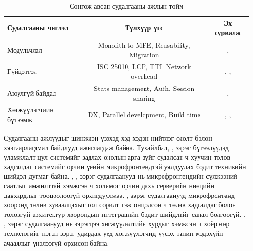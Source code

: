 \begin{table}[H]
\centering
\caption{Сонгож авсан судалгааны ажлын тойм}
\label{tab:related_work_summary}
\renewcommand{\arraystretch}{0.7}
\begin{tabular}{lcc}
\toprule
\textbf{Судалгааны чиглэл} & \textbf{Түлхүүр үгс} & \textbf{Эх сурвалж} \\
\midrule
Модульчлал & Monolith to MFE, Reusability, Migration & \cite{mannisto2023}, \cite{pavlenko2020} \\
Гүйцэтгэл & ISO 25010, LCP, TTI, Network overhead & \cite{ameer2024}, \cite{taibi2022}, \cite{stefanovska2022} \\
Аюулгүй байдал & State management, Auth, Session sharing & \cite{silva2024}, \cite{mohammed2022} \\
Хөгжүүлэгчийн бүтээмж & DX, Parallel development, Build time & \cite{bjelotomic2024}, \cite{tilak2020}, \cite{montelius2021} \\
\bottomrule
\end{tabular}
\end{table}

Судалгааны ажлуудыг шинжлэн үзэхэд хэд хэдэн нийтлэг ололт болон хязгаарлагдмал байдлууд ажиглагдаж байна. Тухайлбал, \cite{mannisto2023}, \cite{pavlenko2020} зэрэг бүтээлүүдэд уламжлалт цул системийг задлах онолын арга зүйг судалсан ч хуучин төлөв хадгалдаг системийг орчин үеийн микрофронтендтэй уялдуулах бодит техникийн шийдэл дутмаг байна. \cite{ameer2024}, \cite{taibi2022}, \cite{stefanovska2022} зэрэг судалгаанууд нь микрофронтендийн сүлжээний саатлыг амжилттай хэмжсэн ч холимог орчин дахь серверийн нөөцийн давхардлыг тооцоолоогүй орхигдуулжээ. \cite{silva2024}, \cite{mohammed2022} зэрэг судалгаанууд микрофронтенд хооронд төлөв хуваалцахыг гол сорилт гэж онцолсон ч төлөв хадгалдаг болон төлөвгүй архитектур хоорондын интеграцийн бодит шийдлийг санал болгоогүй. \cite{bjelotomic2024}, \cite{tilak2020}, \cite{montelius2021} зэрэг судалгаанууд нь зэрэгцээ хөгжүүлэлтийн хурдыг хэмжсэн ч хоёр өөр технологийг нэгэн зэрэг удирдах үед хөгжүүлэгчид үүсэх танин мэдэхүйн ачааллыг үнэлээгүй орхисон байна.

